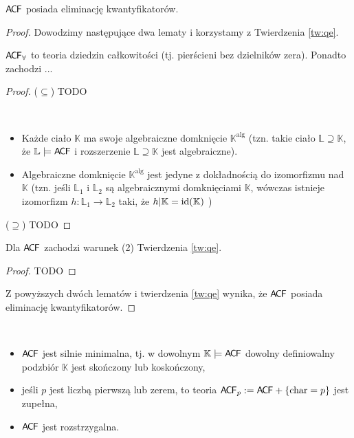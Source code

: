 \documentclass{article}
\begin{document}
\begin{tw}
	$\mathsf{A \mkern-2.0mu C \mkern-1.1mu F}$ posiada eliminację kwantyfikatorów.
\end{tw}
\begin{proof}
Dowodzimy następujące dwa lematy i korzystamy z Twierdzenia \ref{tw:qe}.

\begin{lem}
	$\mathsf{A \mkern-2.0mu C \mkern-1.1mu F}_{\forall}$ to teoria dziedzin całkowitości (tj. pierścieni bez dzielników zera).
	Ponadto zachodzi ... %
\end{lem}
\begin{proof}
	($\subseteq$) TODO

\begin{przyp}[z algebry]
	~\begin{itemize}
		\item Każde ciało $\mathbb{K}$ ma swoje algebraiczne domknięcie $\mathbb{K}^{\text{alg}}$ (tzn. takie ciało $\mathbb{L} \supseteq \mathbb{K}$, że $\mathbb{L} \models \mathsf{A \mkern-2.0mu C \mkern-1.1mu F}$ i rozszerzenie $\mathbb{L} \supseteq \mathbb{K}$ jest algebraiczne).
		\item Algebraiczne domknięcie $\mathbb{K}^{\text{alg}}$ jest jedyne z dokładnością do izomorfizmu nad $\mathbb{K}$ (tzn. jeśli $\mathbb{L}_1$ i $\mathbb{L}_2$ są algebraicznymi domknięciami $\mathbb{K}$, wówczas istnieje izomorfizm $h \colon \mathbb{L}_1 \rightarrow \mathbb{L}_2$ taki, że $h|\mathbb{K} = \text{id}(\mathbb{K})$ )
	\end{itemize}
\end{przyp}


	($\supseteq$) TODO
\end{proof}

\begin{lem}
	Dla $\mathsf{A \mkern-2.0mu C \mkern-1.1mu F}$ zachodzi warunek (2) Twierdzenia \ref{tw:qe}.
\end{lem}
\begin{proof}
TODO
\end{proof}
Z powyższych dwóch lematów i twierdzenia \ref{tw:qe} wynika, że $\mathsf{A \mkern-2.0mu C \mkern-1.1mu F}$ posiada eliminację kwantyfikatorów.
\end{proof}

\begin{wnn}
	~\begin{itemize}
		\item $\mathsf{A \mkern-2.0mu C \mkern-1.1mu F}$ jest silnie minimalna, tj. w dowolnym $\mathbb{K} \models \mathsf{A \mkern-2.0mu C \mkern-1.1mu F}$ dowolny definiowalny podzbiór $\mathbb{K}$ jest skończony lub koskończony,
		\item jeśli $p$ jest liczbą pierwszą lub zerem, to teoria $\mathsf{A \mkern-2.0mu C \mkern-1.1mu F}_p := \mathsf{A \mkern-2.0mu C \mkern-1.1mu F} +  \{\text{char} = p\}$ jest zupełna,
		\item $\mathsf{A \mkern-2.0mu C \mkern-1.1mu F}$ jest rozstrzygalna.
	\end{itemize}
\end{wnn}
\end{document}
